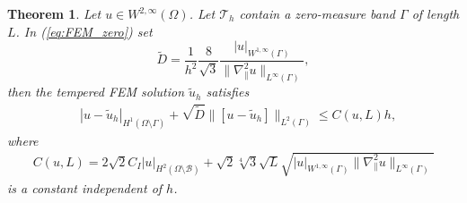 \documentclass{article}
\newtheorem{theorem}[lemma]{Theorem}
\theoremstyle{remark}
\def \Th {{\mathcal T}_h}
\def\B{\mathcal{B}}
\def\WIi{W^{1,\infty}}
\def\WIIi{W^{2,\infty}}
\def\tu{\tilde{u}}
\def\gradt{\nabla_{\!\!{\scriptscriptstyle\parallel}}}
\def\tD{\widetilde{D}}
\begin{document}
\begin{theorem}
\label{thm:FEM_zero_opt}
Let $u\in \WIIi(\Omega)$. Let $\Th$ contain a zero-measure band $\Gamma$ of length $L$. In (\ref{eq:FEM_zero}) set 
\begin{equation}
\label{thm:FEM_zero_opt:D}
\tD=\frac{1}{h^2}\frac{8}{\sqrt{3}}\frac{|u|_{\WIi(\Gamma)}}{\|\gradt^2 u\|_{L^\infty(\Gamma)}},\end{equation}
then the tempered FEM solution $\tu_h$ satisfies
\begin{equation}
\begin{split}
\label{thm:FEM_zero_opt:est}
&|u-\tu_h|_{H^1(\Omega\setminus\Gamma)} +\sqrt{\tD}\big\|[u-\tu_h]\big\|_{L^2(\Gamma)}\leq C(u,L)h,
\end{split}
\end{equation}
where
\begin{equation}
\begin{split}
\label{thm:FEM_zero_opt:est2}
C(u,L)=2\sqrt{2}C_I|u|_{H^2(\Omega\setminus\B)} + \sqrt{2}\sqrt[4]{3}\sqrt{L} \sqrt{|u|_{\WIi(\Gamma)}\|\gradt^2 u\|_{L^\infty(\Gamma)}}
\end{split}
\end{equation}
is a constant independent of $h$.
\end{theorem}
\end{document}
